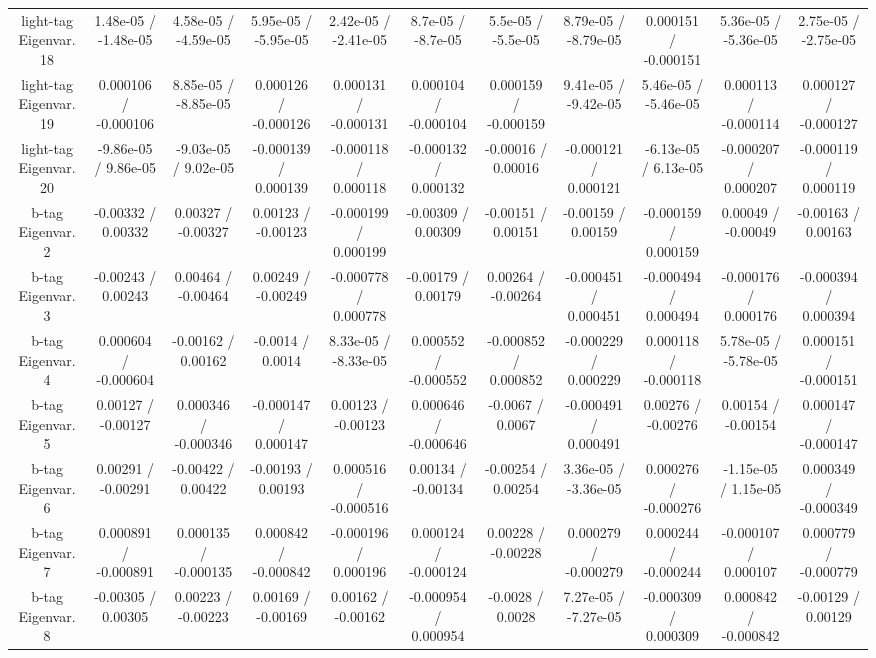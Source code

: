 \begin{table}[htbp]
\begin{center}
\begin{tabular}{|c|c|c|c|c|c|c|c|c|c|c|}
  light-tag Eigenvar. 18 & 1.48e-05 / -1.48e-05 & 4.58e-05 / -4.59e-05 & 5.95e-05 / -5.95e-05 & 2.42e-05 / -2.41e-05 & 8.7e-05 / -8.7e-05 & 5.5e-05 / -5.5e-05 & 8.79e-05 / -8.79e-05 & 0.000151 / -0.000151 & 5.36e-05 / -5.36e-05 & 2.75e-05 / -2.75e-05 \\ 
  light-tag Eigenvar. 19 & 0.000106 / -0.000106 & 8.85e-05 / -8.85e-05 & 0.000126 / -0.000126 & 0.000131 / -0.000131 & 0.000104 / -0.000104 & 0.000159 / -0.000159 & 9.41e-05 / -9.42e-05 & 5.46e-05 / -5.46e-05 & 0.000113 / -0.000114 & 0.000127 / -0.000127 \\ 
  light-tag Eigenvar. 20 & -9.86e-05 / 9.86e-05 & -9.03e-05 / 9.02e-05 & -0.000139 / 0.000139 & -0.000118 / 0.000118 & -0.000132 / 0.000132 & -0.00016 / 0.00016 & -0.000121 / 0.000121 & -6.13e-05 / 6.13e-05 & -0.000207 / 0.000207 & -0.000119 / 0.000119 \\ 
  b-tag Eigenvar. 2 & -0.00332 / 0.00332 & 0.00327 / -0.00327 & 0.00123 / -0.00123 & -0.000199 / 0.000199 & -0.00309 / 0.00309 & -0.00151 / 0.00151 & -0.00159 / 0.00159 & -0.000159 / 0.000159 & 0.00049 / -0.00049 & -0.00163 / 0.00163 \\ 
  b-tag Eigenvar. 3 & -0.00243 / 0.00243 & 0.00464 / -0.00464 & 0.00249 / -0.00249 & -0.000778 / 0.000778 & -0.00179 / 0.00179 & 0.00264 / -0.00264 & -0.000451 / 0.000451 & -0.000494 / 0.000494 & -0.000176 / 0.000176 & -0.000394 / 0.000394 \\ 
  b-tag Eigenvar. 4 & 0.000604 / -0.000604 & -0.00162 / 0.00162 & -0.0014 / 0.0014 & 8.33e-05 / -8.33e-05 & 0.000552 / -0.000552 & -0.000852 / 0.000852 & -0.000229 / 0.000229 & 0.000118 / -0.000118 & 5.78e-05 / -5.78e-05 & 0.000151 / -0.000151 \\ 
  b-tag Eigenvar. 5 & 0.00127 / -0.00127 & 0.000346 / -0.000346 & -0.000147 / 0.000147 & 0.00123 / -0.00123 & 0.000646 / -0.000646 & -0.0067 / 0.0067 & -0.000491 / 0.000491 & 0.00276 / -0.00276 & 0.00154 / -0.00154 & 0.000147 / -0.000147 \\ 
  b-tag Eigenvar. 6 & 0.00291 / -0.00291 & -0.00422 / 0.00422 & -0.00193 / 0.00193 & 0.000516 / -0.000516 & 0.00134 / -0.00134 & -0.00254 / 0.00254 & 3.36e-05 / -3.36e-05 & 0.000276 / -0.000276 & -1.15e-05 / 1.15e-05 & 0.000349 / -0.000349 \\ 
  b-tag Eigenvar. 7 & 0.000891 / -0.000891 & 0.000135 / -0.000135 & 0.000842 / -0.000842 & -0.000196 / 0.000196 & 0.000124 / -0.000124 & 0.00228 / -0.00228 & 0.000279 / -0.000279 & 0.000244 / -0.000244 & -0.000107 / 0.000107 & 0.000779 / -0.000779 \\ 
  b-tag Eigenvar. 8 & -0.00305 / 0.00305 & 0.00223 / -0.00223 & 0.00169 / -0.00169 & 0.00162 / -0.00162 & -0.000954 / 0.000954 & -0.0028 / 0.0028 & 7.27e-05 / -7.27e-05 & -0.000309 / 0.000309 & 0.000842 / -0.000842 & -0.00129 / 0.00129 \\ 

\end{tabular}
\end{center}
\end{table}
